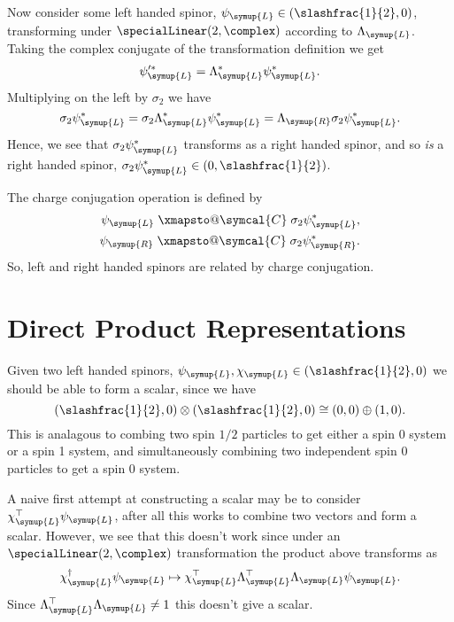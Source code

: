 \documentclass[fleqn]{NotesClass}
\makeatletter
\newcommand{\ident}{1}
\newcommand{\isomorphic}{\cong}
\newcommand{\hermit}{\dagger}
\newcommand{\trans}{\top}
\newcommand{\chargeConjugation}{\symcal{C}}
\newcommand{\Left}{\symup{L}}
\newcommand{\Right}{\symup{R}}
\renewcommand{\xmapsto}[2][]{\mathrel{\mathpalette\xmapsto@{{#1}{#2}}}}
\newcommand{\xmapsto@}[2]{\xmapsto@@{#1}#2}
\newcommand{\xmapsto@@}[3]{%
    \begingroup
    \sbox\z@{$\m@th#1\mathop{}\limits_{\;#2\;}^{\;#3\;}$}%
    \mathop{\Uhextensible width \wd\z@ 0 "27FC}_{#2}^{#3}%
    \endgroup
}
\makeatother
\begin{document}
    Now consider some left handed spinor, \(\psi_{\Left} \in (\slashfrac{1}{2}, 0)\), transforming under \(\specialLinear(2, \complex)\) according to \(\Lambda_{\Left}\).
    Taking the complex conjugate of the transformation definition we get
    \begin{equation}
        \psi_{\Left}'^* = \Lambda_{\Left}^* \psi_{\Left}^*.
    \end{equation}
    Multiplying on the left by \(\sigma_2\) we have
    \begin{equation}
        \sigma_2 \psi_{\Left}^* = \sigma_2\Lambda_{\Left}^* \psi_{\Left}^* = \Lambda_{\Right}\sigma_2\psi_{\Left}^*.
    \end{equation}
    Hence, we see that \(\sigma_2\psi_{\Left}^*\) transforms as a right handed spinor, and so \emph{is} a right handed spinor, \(\sigma_2\psi_{\Left}^* \in (0, \slashfrac{1}{2})\).
    
    The charge conjugation operation is defined by
    \begin{align}
        \psi_{\Left} \xmapsto{\chargeConjugation} \sigma_2 \psi_{\Left}^*,\\
        \psi_{\Right} \xmapsto{\chargeConjugation} \sigma_2 \psi_{\Right}^*.
    \end{align}
    So, left and right handed spinors are related by charge conjugation.
    
    \section{Direct Product Representations}
    Given two left handed spinors, \(\psi_{\Left}, \chi_{\Left} \in (\slashfrac{1}{2}, 0)\) we should be able to form a scalar, since we have
    \begin{equation}
        (\slashfrac{1}{2}, 0) \otimes (\slashfrac{1}{2}, 0) \isomorphic (0, 0) \oplus (1, 0).
    \end{equation}
    This is analagous to combing two spin \(1/2\) particles to get either a spin 0 system or a spin 1 system, and simultaneously combining two independent spin 0 particles to get a spin 0 system.
    
    A naive first attempt at constructing a scalar may be to consider \(\chi_{\Left}^\trans \psi_{\Left}\), after all this works to combine two vectors and form a scalar.
    However, we see that this doesn't work since under an \(\specialLinear(2, \complex)\) transformation the product above transforms as
    \begin{equation}
        \chi_{\Left}^{\hermit} \psi_{\Left} \mapsto \chi_{\Left}^\trans \Lambda_{\Left}^\trans \Lambda_{\Left} \psi_{\Left}.
    \end{equation}
    Since \(\Lambda_{\Left}^\trans \Lambda_{\Left} \ne \ident\) this doesn't give a scalar.
    
\end{document}
